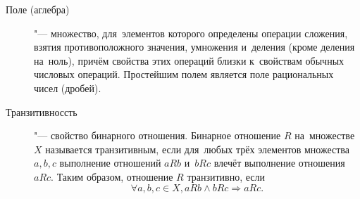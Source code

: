 \documentclass[]{scrartcl}
\begin{document}
\begin{description}
	\item[Поле (аглебра)] "--- множество, для~элементов которого определены операции сложения, взятия противоположного значения, умножения и~деления (кроме деления на~ноль), причём свойства этих операций близки к~свойствам обычных числовых операций. Простейшим полем является поле рациональных чисел (дробей).
	\item[Транзитивноссть] "--- свойство бинарного отношения. Бинарное отношение ${\textstyle R}$ на~множестве ${\textstyle X}$ называется транзитивным, если для~любых трёх элементов множества ${\textstyle a,b,c}$ выполнение отношений ${\textstyle aRb}$ и~${\textstyle bRc}$ влечёт выполнение отношения ${\textstyle aRc}$. Таким образом, отношение ${\textstyle R}$ транзитивно, если
	\begin{equation}\label{eq:transitivity}
	\forall a,b,c \in X, aRb \wedge bRc \Rightarrow aRc.
	\end{equation}
\end{description}
\end{document}
